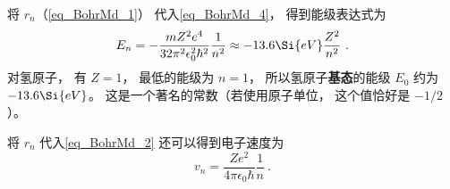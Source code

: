 将 $r_n$（\autoref{eq_BohrMd_1}） 代入\autoref{eq_BohrMd_4}， 得到能级表达式为
\begin{equation}\label{eq_BohrMd_11}
E_n =  - \frac{mZ^2 e^4}{32\pi^2\epsilon_0^2 \hbar ^2} \frac{1}{n^2} \approx  - 13.6\Si{eV}\frac{Z^2}{n^2}~.
\end{equation}
对氢原子， 有 $Z = 1$， 最低的能级为 $n = 1$， 所以氢原子\textbf{基态}的能级 $E_0$ 约为 $-13.6\Si{eV}$。 这是一个著名的常数（若使用原子单位， 这个值恰好是 $-1/2$）。

将 $r_n$ 代入\autoref{eq_BohrMd_2} 还可以得到电子速度为
\begin{equation}\label{eq_BohrMd_10}
v_n = \frac{Z e^2}{4\pi\epsilon_0\hbar} \frac{1}{n}~.
\end{equation}
